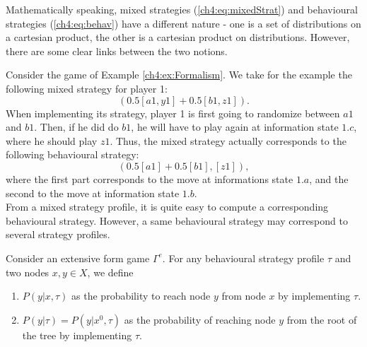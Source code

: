 Mathematically speaking, mixed strategies (\ref{ch4:eq:mixedStrat}) and behavioural strategies (\ref{ch4:eq:behav}) have  a different nature - one is a set of distributions on a cartesian product, the other is a cartesian product on distributions. However, there are some clear links between the two notions.

\begin{example}
Consider the game of Example \ref{ch4:ex:Formalism}.
We take for the example the following mixed strategy for player 1:
$$( 0.5[a1,y1] + 0.5 [b1,z1] ). $$
When implementing its strategy, player 1 is first going to randomize between $a1$ and $b1$. Then, if he did do $b1$, he will have to play again at information state $1.c$, where he should play $z1$.
Thus, the mixed strategy actually corresponds to the following behavioural strategy:
$$ (0.5 [a1] + 0.5 [b1], [z1]), $$
where the first part corresponds to the move at informations state $1.a$, and the second to the move at information state $1.b$. \\
From a mixed strategy profile, it is quite easy to compute a corresponding behavioural strategy. However, a same behavioural strategy may correspond to several strategy profiles.
\end{example}



\begin{definition}
Consider an extensive form game $\Gamma^e$. For any behavioural strategy profile $\tau$ and two nodes $x,y \in X$, we define
\begin{enumerate}
\item $P(y | x, \tau)$ as the probability to reach node $y$ from node $x$ by implementing $\tau$.
\item $P(y|\tau) = P(y | x^0, \tau)$ as the probability of reaching node $y$ from the root of the tree by implementing $\tau$.
\end{enumerate}
\end{definition}

